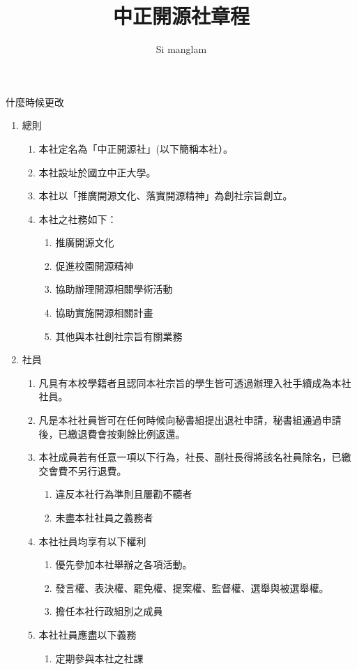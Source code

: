 \documentclass[10pt, a4paper]{cos}
\title{中正開源社章程}
\author{Si manglam}
\begin{document}
\maketitle
\begin{flushright}
什麼時候更改
\end{flushright}
\begin{enumerate}
\item 總則
\begin{enumerate}
\item 本社定名為「中正開源社」(以下簡稱本社）。
\item 本社設址於國立中正大學。
\item 本社以「推廣開源文化、落實開源精神」為創社宗旨創立。
\item 本社之社務如下：
\begin{enumerate}
\item 推廣開源文化
\item 促進校園開源精神
\item 協助辦理開源相關學術活動
\item 協助實施開源相關計畫
\item 其他與本社創社宗旨有關業務
\end{enumerate}
\end{enumerate}
\item 社員
\begin{enumerate}
\item 凡具有本校學籍者且認同本社宗旨的學生皆可透過辦理入社手續成為本社社員。
\item 凡是本社社員皆可在任何時候向秘書組提出退社申請，秘書組通過申請後，已繳退費會按剩餘比例返還。
\item 本社成員若有任意一項以下行為，社長、副社長得將該名社員除名，已繳交會費不另行退費。
\begin{enumerate}
\item 違反本社行為準則且屢勸不聽者
\item 未盡本社社員之義務者
\end{enumerate}
\item 本社社員均享有以下權利
\begin{enumerate}
\item 優先參加本社舉辦之各項活動。
\item 發言權、表決權、罷免權、提案權、監督權、選舉與被選舉權。
\item 擔任本社行政組別之成員
\end{enumerate}
\item 本社社員應盡以下義務
\begin{enumerate}
\item 定期參與本社之社課

\end{enumerate}
\end{enumerate}
\end{enumerate}
\end{document}
